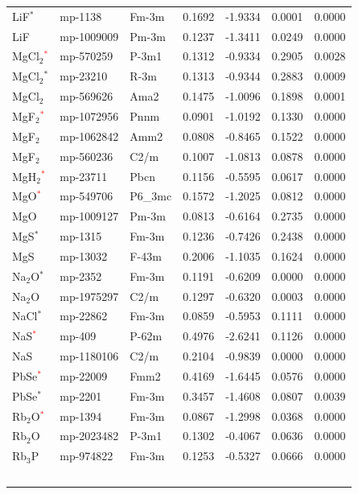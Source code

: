 \begin{longtable}{@{}lllrrrr@{}}
LiF$^*$ & mp-1138 & Fm-3m & 0.1692 & -1.9334 & 0.0001 & 0.0000 \\
LiF & mp-1009009 & Pm-3m & 0.1237 & -1.3411 & 0.0249 & 0.0000 \\
MgCl$_{2}$\textcolor{red}{$^*$} & mp-570259 & P-3m1 & 0.1312 & -0.9334 & 0.2905 & 0.0028 \\
MgCl$_{2}$$^*$ & mp-23210 & R-3m & 0.1313 & -0.9344 & 0.2883 & 0.0009 \\
MgCl$_{2}$ & mp-569626 & Ama2 & 0.1475 & -1.0096 & 0.1898 & 0.0001 \\
MgF$_{2}$\textcolor{red}{$^*$} & mp-1072956 & Pnnm & 0.0901 & -1.0192 & 0.1330 & 0.0000 \\
MgF$_{2}$ & mp-1062842 & Amm2 & 0.0808 & -0.8465 & 0.1522 & 0.0000 \\
MgF$_{2}$ & mp-560236 & C2/m & 0.1007 & -1.0813 & 0.0878 & 0.0000 \\
MgH$_{2}$\textcolor{red}{$^*$} & mp-23711 & Pbcn & 0.1156 & -0.5595 & 0.0617 & 0.0000 \\
MgO\textcolor{red}{$^*$} & mp-549706 & P6\_3mc & 0.1572 & -1.2025 & 0.0812 & 0.0000 \\
MgO & mp-1009127 & Pm-3m & 0.0813 & -0.6164 & 0.2735 & 0.0000 \\
MgS$^*$ & mp-1315 & Fm-3m & 0.1236 & -0.7426 & 0.2438 & 0.0000 \\
MgS & mp-13032 & F-43m & 0.2006 & -1.1035 & 0.1624 & 0.0000 \\
Na$_{2}$O$^*$ & mp-2352 & Fm-3m & 0.1191 & -0.6209 & 0.0000 & 0.0000 \\
Na$_{2}$O & mp-1975297 & C2/m & 0.1297 & -0.6320 & 0.0003 & 0.0000 \\
NaCl$^*$ & mp-22862 & Fm-3m & 0.0859 & -0.5953 & 0.1111 & 0.0000 \\
NaS\textcolor{red}{$^*$} & mp-409 & P-62m & 0.4976 & -2.6241 & 0.1126 & 0.0000 \\
NaS & mp-1180106 & C2/m & 0.2104 & -0.9839 & 0.0000 & 0.0000 \\
PbSe\textcolor{red}{$^*$} & mp-22009 & Fmm2 & 0.4169 & -1.6445 & 0.0576 & 0.0000 \\
PbSe$^*$ & mp-2201 & Fm-3m & 0.3457 & -1.4608 & 0.0807 & 0.0039 \\
Rb$_{2}$O\textcolor{red}{$^*$} & mp-1394 & Fm-3m & 0.0867 & -1.2998 & 0.0368 & 0.0000 \\
Rb$_{2}$O & mp-2023482 & P-3m1 & 0.1302 & -0.4067 & 0.0636 & 0.0000 \\
Rb$_{3}$P & mp-974822 & Fm-3m & 0.1253 & -0.5327 & 0.0666 & 0.0000 \\
$$
\end{longtable}
